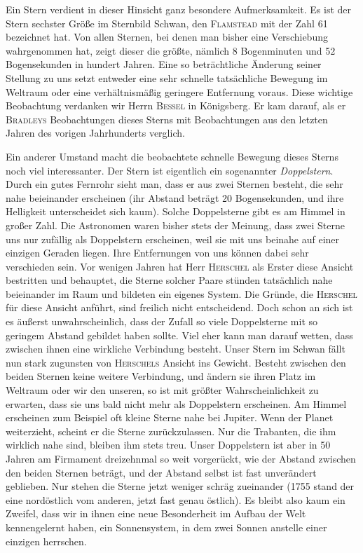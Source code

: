Ein Stern verdient in dieser Hinsicht ganz besondere Aufmerksamkeit. Es ist der Stern sechster Größe im Sternbild Schwan, den \textsc{Flamstead} mit der Zahl 61 bezeichnet hat. Von allen Sternen, bei denen man bisher eine Verschiebung wahrgenommen hat, zeigt dieser die größte, nämlich 8 Bogenminuten und 52 Bogensekunden in hundert Jahren. Eine so beträchtliche Änderung seiner Stellung zu uns setzt entweder eine sehr schnelle tatsächliche Bewegung im Weltraum oder eine verhältnismäßig geringere Entfernung voraus. Diese wichtige Beobachtung verdanken wir Herrn \textsc{Bessel} in Königsberg. Er kam darauf, als er \textsc{Bradleys} Beobachtungen dieses Sterns mit Beobachtungen aus den letzten Jahren des vorigen Jahrhunderts verglich.

Ein anderer Umstand macht die beobachtete schnelle Bewegung dieses Sterns noch viel interessanter. Der Stern ist eigentlich ein sogenannter \emph{Doppelstern}. Durch ein gutes Fernrohr sieht man, dass er aus zwei Sternen besteht, die sehr nahe beieinander erscheinen (ihr Abstand beträgt 20 Bogensekunden, und ihre Helligkeit unterscheidet sich kaum). Solche Doppelsterne gibt es am Himmel in großer Zahl. Die Astronomen waren bisher stets der Meinung, dass zwei Sterne uns nur zufällig als Doppelstern erscheinen, weil sie mit uns beinahe auf einer einzigen Geraden liegen. Ihre Entfernungen von uns können dabei sehr verschieden sein. Vor wenigen Jahren hat Herr \textsc{Herschel} als Erster diese Ansicht bestritten und behauptet, die Sterne solcher Paare stünden tatsächlich nahe beieinander im Raum und bildeten ein eigenes System. Die Gründe, die \textsc{Herschel} für diese Ansicht anführt, sind freilich nicht entscheidend. Doch schon an sich ist es äußerst unwahrscheinlich,
%
dass der Zufall so viele Doppelsterne mit so geringem Abstand gebildet haben sollte. Viel eher kann man darauf wetten, dass zwischen ihnen eine wirkliche Verbindung besteht. Unser Stern im Schwan fällt nun stark zugunsten von \textsc{Herschels} Ansicht ins Gewicht. Besteht zwischen den beiden Sternen keine weitere Verbindung, und ändern sie ihren Platz im Weltraum oder wir den unseren, so ist mit größter Wahrscheinlichkeit zu erwarten, dass sie uns bald nicht mehr als Doppelstern erscheinen. Am Himmel erscheinen zum Beispiel oft kleine Sterne nahe bei Jupiter. Wenn der Planet weiterzieht, scheint er die Sterne zurückzulassen. Nur die Trabanten, die ihm wirklich nahe sind, bleiben ihm stets treu. Unser Doppelstern ist aber in 50 Jahren am Firmament dreizehnmal so weit vorgerückt, wie der Abstand zwischen den beiden Sternen beträgt, und der Abstand selbst ist fast unverändert geblieben. Nur stehen die Sterne jetzt weniger schräg zueinander (1755 stand der eine nordöstlich vom anderen, jetzt fast genau östlich). Es bleibt also kaum ein Zweifel, dass wir in ihnen eine neue Besonderheit im Aufbau der Welt kennengelernt haben, ein Sonnensystem, in dem zwei Sonnen anstelle einer einzigen herrschen.

